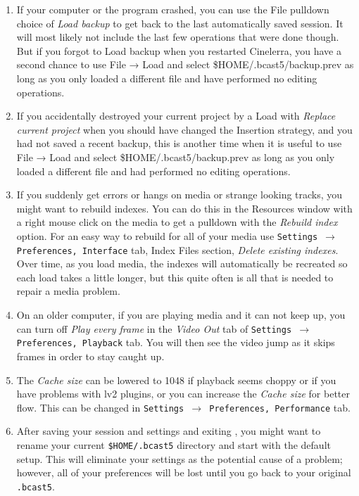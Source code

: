 \begin{enumerate}
        \item If your computer or the program crashed, you can use the File pulldown choice
of \textit{Load backup} to get back to the last automatically saved session. It will most
likely not include the last few operations that were done though.  But if you forgot to 
Load backup when you restarted Cinelerra, you have a second chance to use File → Load and
select \$HOME/.bcast5/backup.prev as long as you only loaded a different file and have
performed no editing operations.
         \item If you accidentally destroyed your current project by a Load with 
\textit{Replace current project} when you should have changed the Insertion strategy, and 
you had not saved a recent backup, this is another time when it is useful to use
File → Load and select \$HOME/.bcast5/backup.prev as long as you only loaded a different
file and had performed no editing operations.
	\item If you suddenly get errors or hangs on media or strange looking tracks, you might want to rebuild indexes. You can do this in the Resources window with a right mouse click on the media to get a pulldown with the \textit{Rebuild index} option. For an easy way to rebuild for all of your media use \texttt{Settings $\rightarrow$ Preferences, Interface} tab, Index Files section, \textit{Delete existing indexes}. Over time, as you
load media, the indexes will automatically be recreated so each load takes a little longer, but this quite often
is all that is needed to repair a media problem.
	\item On an older computer, if you are playing media and it can not keep up, you can turn off \textit{Play every frame} in the \textit{Video Out} tab of \texttt{Settings $\rightarrow$ Preferences, Playback} tab. You will then see the video jump as it skips frames in order to stay caught up.
	\item The \textit{Cache size} can be lowered to 1048 if playback seems choppy or if you have problems with lv2 plugins, or you can increase the \textit{Cache size} for better flow. This can be changed in \texttt{Settings $\rightarrow$ Preferences, Performance} tab.
	\item After saving your session and settings and exiting \CGG{}, you might want to rename your current \texttt{\$HOME/.bcast5} directory and start with the default setup. This will eliminate your settings as the potential cause of a problem; however, all of your preferences will be lost until you go back to your original \texttt{.bcast5}.

\end{enumerate}
